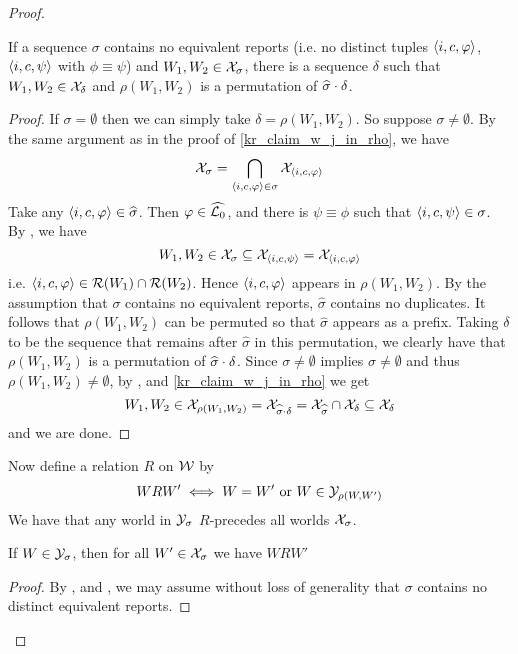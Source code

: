 \begin{proof}
    \begin{claim}
        \label{kr_claim_exists_delta}
        If a sequence $\sigma$ contains no equivalent reports (i.e. no distinct
        tuples $\langle {i, c, \varphi} \rangle$, $\langle {i, c, \psi} \rangle$ with $\phi \equiv
        \psi$) and $W_1, W_2 \in \mathcal{X}_\sigma$, there is a sequence $\delta$ such
        that $W_1, W_2 \in \mathcal{X}_\delta$ and $\rho(W_1, W_2)$ is a permutation of
        $\widehat{\sigma} \cdot \delta$.
    \end{claim}
    \begin{proof}
        If $\sigma = \emptyset$ then we can simply take $\delta = \rho(W_1,
        W_2)$. So suppose $\sigma \ne \emptyset$. By the same argument as in
        the proof of \cref{kr_claim_w_j_in_rho}, we have
        \[
            \mathcal{X}_\sigma = \bigcap_{\langle {i, c, \varphi} \rangle \in \sigma}{\mathcal{X}_{\langle {i, c,
            \varphi} \rangle}}
        \]
        Take any $\langle {i, c, \varphi} \rangle \in \widehat{\sigma}$. Then $\varphi \in
        \widehat{\mathcal{L}{}_0}$, and there is $\psi \equiv \phi$ such that $\langle {i,
        c, \psi} \rangle \in \sigma$. By \equivpost{}, we have
        \[
            W_1, W_2
            \in \mathcal{X}_\sigma
            \subseteq \mathcal{X}_{\langle {i, c, \psi} \rangle}
            = \mathcal{X}_{\langle {i, c, \varphi} \rangle}
        \]
        i.e. $\langle {i, c, \varphi} \rangle \in \mathcal{R}(W_1) \cap \mathcal{R}(W_2)$. Hence
        $\langle {i, c, \varphi} \rangle$ appears in $\rho(W_1, W_2)$. By the assumption
        that $\sigma$ contains no equivalent reports, $\widehat{\sigma}$
        contains no duplicates. It follows that $\rho(W_1, W_2)$ can be
        permuted so that $\widehat{\sigma}$ appears as a prefix. Taking
        $\delta$ to be the sequence that remains after $\widehat{\sigma}$ in
        this permutation, we clearly have that $\rho(W_1, W_2)$ is a
        permutation of $\widehat{\sigma} \cdot \delta$. Since $\sigma \ne
        \emptyset$ implies $\widehat{\sigma} \ne \emptyset$ and thus $\rho(W_1,
        W_2) \ne \emptyset$, by \rearr{}, \kconj{} and
        \cref{kr_claim_w_j_in_rho} we get
        \[
            W_1, W_2 \in \mathcal{X}_{\rho(W_1, W_2)}
            = \mathcal{X}_{\widehat{\sigma} \cdot \delta}
            = \mathcal{X}_{\widehat{\sigma}} \cap \mathcal{X}_\delta
            \subseteq \mathcal{X}_\delta
        \]
        and we are done.
    \end{proof}

Now define a relation $R$ on $\mathcal{W}$ by
\[
    W R W' \iff W = W' \text{ or } W \in \mathcal{Y}_{\rho(W, W')}
\]
We have that any world in $\mathcal{Y}_\sigma$ $R$-precedes all worlds $\mathcal{X}_\sigma$.

    \begin{claim}
        \label{kr_claim_y_subset_minimal}
        If $W \in \mathcal{Y}_\sigma$, then for all $W' \in \mathcal{X}_\sigma$ we have $W R W'$
    \end{claim}
    \begin{proof}
        By \rearr{}, \equivpost{} and
        \duprem{}, we may assume without loss of generality that
        $\sigma$ contains no distinct equivalent reports.


\end{proof}
\end{proof}
